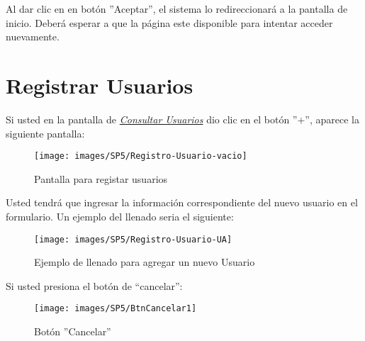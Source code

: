             
            Al dar clic en en botón ''Aceptar'', el sistema  lo redireccionará  a la pantalla de inicio. Deberá esperar a que la página este disponible para intentar acceder nuevamente.
        

    \newpage
        
        \section{Registrar Usuarios} 
            Si usted  en la pantalla de \hyperlink{consultarUs}{\textit{Consultar Usuarios}} dio clic en el botón ''+'', aparece la siguiente pantalla:
            
            \begin{figure}[!hbtp]
                \centering
                \hypertarget{registrarUs}{\texttt{[image: images/SP5/Registro-Usuario-vacio]}}
                \caption{Pantalla para registar usuarios}
                \label{registrarrh}
            \end{figure}
            
            Usted tendrá que ingresar la información correspondiente del nuevo usuario en el formulario. Un ejemplo del llenado seria el siguiente:
        
            \begin{figure}[!hbtp]
                \centering
                \hypertarget{ejreg}{\texttt{[image: images/SP5/Registro-Usuario-UA]}}
                \caption{Ejemplo de llenado para agregar un nuevo Usuario}
                \label{ejreg}
            \end{figure}
    
    \newpage
            Si usted presiona el botón de “cancelar”: 
            
            \begin{figure}[!hbtp]
                \centering
                \hypertarget{cancel1}{\texttt{[image: images/SP5/BtnCancelar1]}}
                \caption{Botón ''Cancelar''}
                \label{cancel1}
            \end{figure}
            
